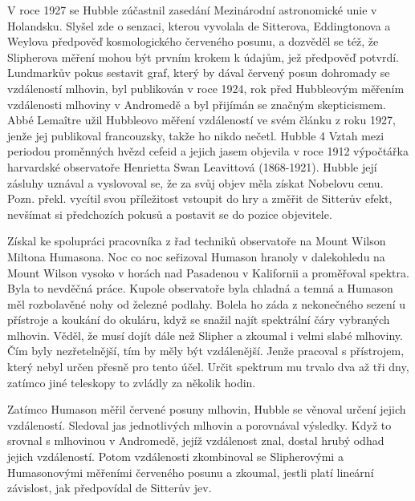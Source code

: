   V roce 1927 se Hubble zúčastnil zasedání Mezinárodní astronomické unie v Holandsku. Slyšel zde o
  senzaci, kterou vyvolala de Sitterova, Eddingtonova a Weylova předpověď kosmologického červeného
  posunu, a dozvěděl se též, že Slipherova měření mohou být prvním krokem k údajům, jež předpověď
  potvrdí. Lundmarkův pokus sestavit graf, který by dával červený posun dohromady se vzdáleností
  mlhovin, byl publikován v roce 1924, rok před Hubbleovým měřením vzdálenosti mlhoviny v Andromedě
  a byl přijímán se značným skepticismem. Abbé Lemaître užil Hubbleovo měření vzdáleností ve svém
  článku z roku 1927, jenže jej publikoval francouzsky, takže ho nikdo nečetl. Hubble 4 Vztah mezi
  periodou proměnných hvězd cefeid a jejich jasem objevila v roce 1912 výpočtářka harvardské
  observatoře Henrietta Swan Leavittová (1868-1921). Hubble její zásluhy uznával a vyslovoval se, že
  za svůj objev měla získat Nobelovu cenu. Pozn. překl. vycítil svou příležitost vstoupit do hry a
  změřit de Sitterův efekt, nevšímat si předchozích pokusů a postavit se do pozice objevitele.
  

  Získal ke spolupráci pracovníka z řad techniků observatoře na Mount Wilson Miltona Humasona. Noc
  co noc seřizoval Humason hranoly v dalekohledu na Mount Wilson vysoko v horách nad Pasadenou v
  Kalifornii a proměřoval spektra. Byla to nevděčná práce. Kupole observatoře byla chladná a temná a
  Humason měl rozbolavěné nohy od železné podlahy. Bolela ho záda z nekonečného sezení u přístroje a
  koukání do okuláru, když se snažil najít spektrální čáry vybraných mlhovin. Věděl, že musí dojít
  dále než Slipher a zkoumal i velmi slabé mlhoviny. Čím byly nezřetelnější, tím by měly být
  vzdálenější. Jenže pracoval s přístrojem, který nebyl určen přesně pro tento účel. Určit spektrum
  mu trvalo dva až tři dny, zatímco jiné teleskopy to zvládly za několik hodin. 
  
  Zatímco Humason měřil červené posuny mlhovin, Hubble se věnoval určení jejich vzdáleností.
  Sledoval jas jednotlivých mlhovin a porovnával výsledky. Když to srovnal s mlhovinou v Andromedě,
  jejíž vzdálenost znal, dostal hrubý odhad jejich vzdáleností. Potom vzdálenosti zkombinoval se
  Slipherovými a Humasonovými měřeními červeného posunu a zkoumal, jestli platí lineární závislost,
  jak předpovídal de Sitterův jev. 
  
